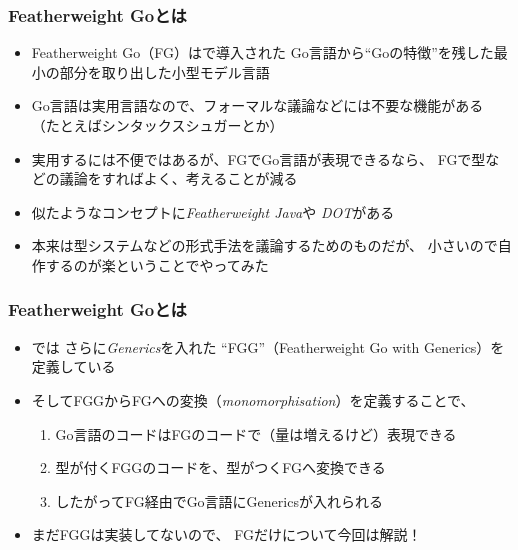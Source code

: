 \begin{frame}
  \frametitle{Featherweight Goとは}

  \pause
  \begin{itemize}
    \item<+-> Featherweight Go（FG）は\cite{griesemer2020featherweight}で導入された
    Go言語から``Goの特徴''を残した最小の部分を取り出した小型モデル言語

    \item<+-> Go言語は実用言語なので、フォーマルな議論などには不要な機能がある
    （たとえばシンタックスシュガーとか）

    \item<+-> 実用するには不便ではあるが、FGでGo言語が表現できるなら、
    FGで型などの議論をすればよく、考えることが減る

    \item<+-> 似たようなコンセプトに\emph{Featherweight Java}\cite{10.1145/503502.503505}や
    \emph{DOT}\cite{Amin:215280}がある

    \item<+-> 本来は型システムなどの形式手法を議論するためのものだが、
    小さいので自作するのが楽ということでやってみた
  \end{itemize}
\end{frame}

\begin{frame}
  \frametitle{Featherweight Goとは}

  \begin{itemize}
    \item<+-> \cite{griesemer2020featherweight}では
    さらに\emph{Generics}を入れた
    ``FGG''（Featherweight Go with Generics）を定義している

    \item<+-> そしてFGGからFGへの変換（\emph{monomorphisation}）を定義することで、
    \begin{enumerate}
      \item Go言語のコードはFGのコードで（量は増えるけど）表現できる
      \item 型が付くFGGのコードを、型がつくFGへ変換できる
      \item したがってFG経由でGo言語にGenericsが入れられる
    \end{enumerate}

    \item<+-> まだFGGは実装してないので、
    FGだけについて今回は解説！
 \end{itemize}
\end{frame}

